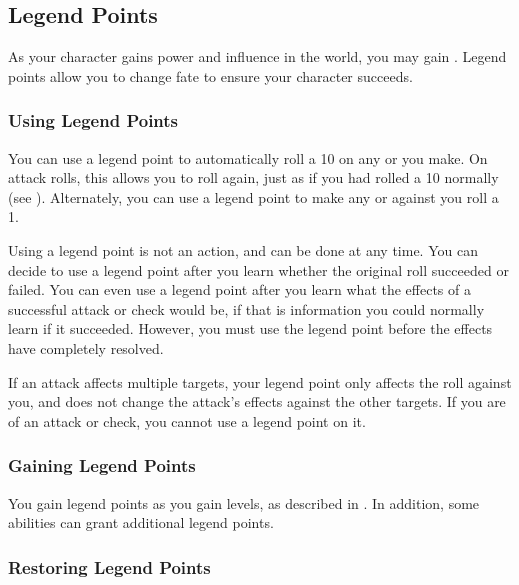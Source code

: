     \subsection{Legend Points}\label{Legend Points}

        As your character gains power and influence in the world, you may gain .
        Legend points allow you to change fate to ensure your character succeeds.

        \subsubsection{Using Legend Points}
            You can use a legend point to automatically roll a 10 on any  or  you make.
            On attack rolls, this allows you to roll again, just as if you had rolled a 10 normally (see ).
            Alternately, you can use a legend point to make any  or  against you roll a 1.

            Using a legend point is not an action, and can be done at any time.
            You can decide to use a legend point after you learn whether the original roll succeeded or failed.
            You can even use a legend point after you learn what the effects of a successful attack or check would be, if that is information you could normally learn if it succeeded.
            However, you must use the legend point before the effects have completely resolved.

            If an attack affects multiple targets, your legend point only affects the roll against you, and does not change the attack's effects against the other targets.
            If you are  of an attack or check, you cannot use a legend point on it.

        \subsubsection{Gaining Legend Points}

            You gain legend points as you gain levels, as described in .
            In addition, some abilities can grant additional legend points.

        \subsubsection{Restoring Legend Points}

